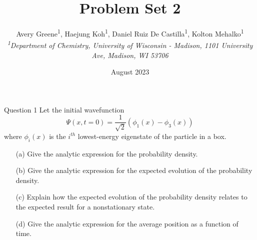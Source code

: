 \documentclass{article}
\title{\LARGE {\fontfamily{qhv}\selectfont \textcolor{MSBlue}{Problem Set 2}}}
\author{\vspace{0.2cm} Avery Greene\textsuperscript{1}, Haejung Koh\textsuperscript{1}, Daniel Ruiz De Castilla\textsuperscript{1}, Kolton Mehalko\textsuperscript{1} 
 \\[0.2 cm]
\small{\textit{\textsuperscript{1}Department of Chemistry, University of Wisconsin - Madison, 1101 University Ave, Madison, WI 53706}}}
\date{August 2023}
\makeatletter
\renewcommand{\maketitle}{\bgroup\setlength{\parindent}{0pt}
\begin{flushleft}
  \textbf{\@title}

  \@author
\end{flushleft}\egroup
}
\makeatother
\begin{document}
\maketitle

\begin{mybox}{Question 1}
Let the initial wavefunction
\[
\Psi(x, t = 0) = \frac{1}{\sqrt{2}}(\phi_1(x) - \phi_3(x))
\]
where $\phi_i(x)$ is the $i^{th}$ lowest-energy eigenstate of the particle in a box.
\begin{itemize}
    \item[(a)] Give the analytic expression for the probability density.
    \item[(b)] Give the analytic expression for the expected evolution of the probability density.
    \item[(c)] Explain how the expected evolution of the probability density relates to the expected result for a nonstationary state.
    \item[(d)] Give the analytic expression for the average position as a function of time.
\end{itemize}
\end{mybox}
\end{document}
